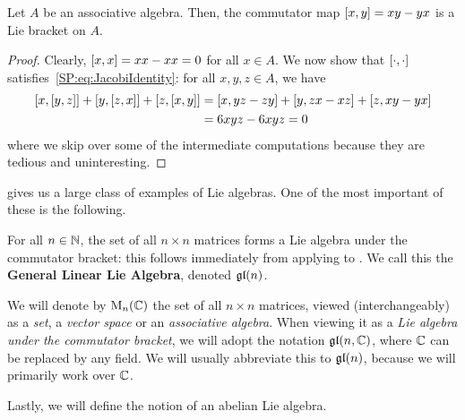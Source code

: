 \begin{boxlemma}\label{Ch1:Lemma:CommBracket}
    Let $A$ be an associative algebra. Then, the commutator map $\left[ x, y \right] = xy - yx$ is a Lie bracket on $A$.
\end{boxlemma}
\begin{proof}  %
    Clearly, $\left[ x, x \right] = xx - xx = 0$ for all $x \in A$. We now show that $\left[ \cdot, \cdot \right]$ satisfies~\eqref{SP:eq:JacobiIdentity}: for all $x, y, z \in A$, we have
    \begin{align*}
        \brac{x, \brac{y, z}} + \brac{y, \brac{z, x}} + \brac{z, \brac{x, y}} &= \brac{x, yz - zy} + \brac{y, zx - xz} + \brac{z, xy - yx} \\
        &= %
        6xyz - 6xyz = 0
    \end{align*}
    where we skip over some of the intermediate computations because they are tedious and uninteresting.
\end{proof}

 gives us a large class of examples of Lie algebras. One of the most important of these is the following.

\begin{boxexample}\label{Ch1:Eg:gl}
    For all $n \in \mathbb{N}$, the set of all $n \times n$ matrices forms a Lie algebra under the commutator bracket: this follows immediately from applying  to . We call this the \textbf{General Linear Lie Algebra}, denoted $\mathfrak{gl}\!\left( n \right)$.
\end{boxexample}

\begin{boxconvention}
    We will denote by $\operatorname{M}_{n}\!\left( \mathbb{C} \right)$ the set of all $n \times n$ matrices, viewed (interchangeably) as a \textit{set}, a \textit{vector space} or an \textit{associative algebra}. When viewing it as a \textit{Lie algebra under the commutator bracket}, we will adopt the notation $\mathfrak{gl}\!\left( n, \mathbb{C} \right)$, where $\mathbb{C}$ can be replaced by any field. We will usually abbreviate this to $\mathfrak{gl}\!\left( n \right)$, because we will primarily work over $\mathbb{C}$.
\end{boxconvention}

Lastly, we will define the notion of an abelian Lie algebra.

